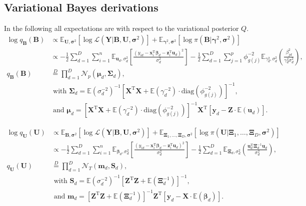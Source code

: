 \documentclass[a4paper,hidelinks]{article}\usepackage[]{graphicx}\usepackage[]{color}
\newcommand{\bbeta}{\bm{\beta}}
\newcommand{\bsigma}{\bm{\sigma}}
\newcommand{\bSigma}{\bm{\Sigma}}
\newcommand{\bmu}{\bm{\mu}}
\newcommand{\Y}{\mathbf{Y}}
\newcommand{\y}{\mathbf{y}}
\newcommand{\X}{\mathbf{X}}
\newcommand{\x}{\mathbf{x}}
\newcommand{\bgamma}{\bm{\gamma}}
\newcommand{\Z}{\mathbf{Z}}
\newcommand{\B}{\mathbf{B}}
\newcommand{\U}{\mathbf{U}}
\newcommand{\Sm}{\mathbf{S}}
\newcommand{\0}{\bm{0}}
\newcommand{\E}{\mathbb{E}}
\newcommand{\tr}{^{\text{T}}}
\newcommand{\diag}{\text{diag}}
\renewcommand{\(}{\left(}
\renewcommand{\)}{\right)}
\renewcommand{\[}{\left[}
\renewcommand{\]}{\right]}
\begin{document}
	\begin{appendix}
		\section{Variational Bayes derivations}\label{app:derivations}
		In the following all expectations are with respect to the variational posterior $Q$.
		\begin{align*}
		\log q_{\B} (\B) & \propto \E_{\mathbf{U}, \bsigma^2} [\log \mathcal{L}(\Y | \B, \U, \bsigma^2 )] + \E_{\bgamma^2, \bsigma^2} [\log \pi (\B | \bgamma^2, \bsigma^2)] \\
		& \propto - \frac{1}{2} \sum_{d=1}^D \sum_{i=1}^n \E_{\mathbf{u}_d, \sigma_d^2} \[ \frac{(y_{id} - \x_i \tr \bbeta_d - \mathbf{z}_i \tr \mathbf{u}_d)^2}{\sigma_d^2} \] - \frac{1}{2} \sum_{d=1}^D \sum_{j=1}^p \phi_{g(j)}^{-2} \E_{\gamma^2_d, \sigma^2_d} \( \frac{\beta_{jd}^2}{\gamma_d^2 \sigma_d^2} \), \\
		q_{\B} (\B) & \overset{D}{=} \prod_{d=1}^{D} \mathcal{N}_p (\bmu_d, \bSigma_d), \\
		& \text{ with } \bSigma_d = \E(\sigma_d^{-2})^{-1} [\X \tr \X + \E(\gamma_d^{-2}) \cdot \diag (\phi_{g(j)}^{-2}) ]^{-1}, \\
		& \text{ and } \bmu_d = [\X \tr \X + \E(\gamma_d^{-2}) \cdot \diag (\phi_{g(j)}^{-2}) ]^{-1} \X \tr [\y_d - \Z \cdot \E(\mathbf{u}_d)].
		\end{align*}
		
		\begin{align*}
		\log q_{\U}(\U) & \propto \E_{\mathbf{B}, \bsigma^2} [\log \mathcal{L}(\Y | \B, \U, \bsigma^2 )] + \E_{\mathbf{\Xi}_1, \dots, \mathbf{\Xi}_D, \bsigma^2} [\log \pi (\U | \mathbf{\Xi}_1, \dots, \mathbf{\Xi}_D, \bsigma^2)] \\
		& \propto - \frac{1}{2} \sum_{d=1}^D \sum_{i=1}^n \E_{\bbeta_d, \sigma_d^2} \[ \frac{(y_{id} - \x_i \tr \bbeta_d - \mathbf{z}_i \tr \mathbf{u}_d)^2}{\sigma_d^2} \] - \frac{1}{2} \sum_{d=1}^D \E_{\bm{\Xi}_d, \sigma_d^2}\( \frac{\mathbf{u}_d \tr \bm{\Xi}_d^{-1} \mathbf{u}_d}{\sigma_d^2} \), \\
		q_{\U}(\U) & \overset{D}{=} \prod_{d=1}^{D} \mathcal{N}_T (\mathbf{m}_d, \Sm_d), \\
		& \text{ with } \Sm_d = \E(\sigma_d^{-2})^{-1} [\Z \tr \Z + \E(\bm{\Xi}_d^{-1}) ]^{-1}, \\
		& \text{ and } \mathbf{m}_d = [\Z \tr \Z + \E(\bm{\Xi}_d^{-1}) ]^{-1} \Z \tr [\y_d - \X \cdot \E(\bbeta_d)].
		\end{align*}


\end{appendix}
\end{document}
